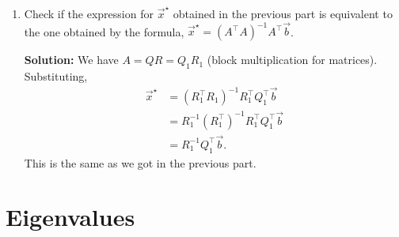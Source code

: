 \documentclass[10pt]{article}
\begin{document}
\begin{enumerate}[label=(\alph*)]
    \textbf{Solution:} We have,
    \begin{equation}
        \|\vec{r}\|_2^2 = \left\| Q_1^\top \vec{b} - R_1 \vec{x} \right\|_2^2 + \left\| Q_2^\top \vec{b} \right\|_2^2.
    \end{equation}
    Since we have no control over the term $\left\| Q_2^\top \vec{b} \right\|_2^2$ (i.e., no matter how we change $\vec{x}$, that term stays constant because it doesn't involve $\vec{x}$ at all), it is irrelevant from the perspective of the optimization, and so the optimal $\vec{x}^\star$ is one which minimizes $\left\| Q_1^\top \vec{b} - R_1 \vec{x} \right\|_2^2$. This expression is minimized when $Q_1^\top \vec{b} = R_1 \vec{x}$, and using the fact that $R_1$ is invertible we have $\vec{x}^\star = R_1^{-1} Q_1^\top \vec{b}$.

    \item Check if the expression for $\vec{x}^\star$ obtained in the previous part is equivalent to the one obtained by the formula,
    $\vec{x}^\star = (A^\top A)^{-1} A^\top \vec{b}$.

    \textbf{Solution:} We have $A = QR = Q_1 R_1$ (block multiplication for matrices). Substituting,
    \begin{align}
        \vec{x}^\star &= (R_1^\top R_1)^{-1} R_1^\top Q_1^\top \vec{b} \\
        &= R_1^{-1} (R_1^\top)^{-1} R_1^\top Q_1^\top \vec{b} \\
        &= R_1^{-1} Q_1^\top \vec{b}.
    \end{align}
    This is the same as we got in the previous part.
\end{enumerate}

\newpage

\section{Eigenvalues}
\end{document}
